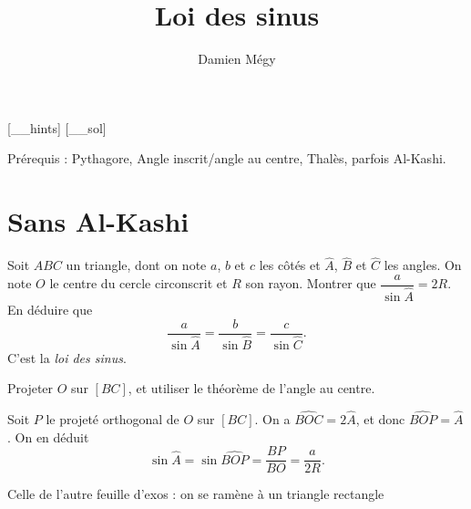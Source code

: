 





[_\jobname_hints]
[_\jobname_sol]


\title{Loi des sinus}
\author{Damien Mégy}
\maketitle

\avertissement 

Prérequis : Pythagore, Angle inscrit/angle au centre, Thalès, parfois Al-Kashi.

\section{Sans Al-Kashi}

\begin{exo}
Soit $ABC$ un triangle, dont on note $a$, $b$ et $c$ les côtés et $\widehat A$, $\widehat B$ et $\widehat C$ les angles.
On note $O$ le centre du cercle  circonscrit et $R$ son rayon.
Montrer que $\dfrac{a}{\sin \widehat A} = 2R$.
En déduire que
\[ \frac{a}{\sin \widehat A} = \frac{b}{\sin \widehat B}  = \frac{c}{\sin \widehat C}.\]
C'est la \emph{loi des sinus}.
\begin{hint}
Projeter $O$ sur $[BC]$, et utiliser le théorème de l'angle au centre.
\end{hint}
\begin{sol}
Soit $P$ le projeté orthogonal de $O$ sur $[BC]$.
On a $\widehat{BOC} = 2\widehat{A}$, et donc $\widehat{BOP}=\widehat A$.
On en déduit 
\[ \sin \widehat A = \sin \widehat{BOP}
= \frac{BP}{BO} = \frac{a}{2R}.\]
\end{sol}
\end{exo}


\begin{exo}
Celle de l'autre feuille d'exos : on se ramène à un triangle rectangle
\begin{hint}
\end{hint}
\begin{sol}
\end{sol}
\end{exo}

\begin{exo}
\begin{hint}
\end{hint}
\begin{sol}
\end{sol}
\end{exo}

